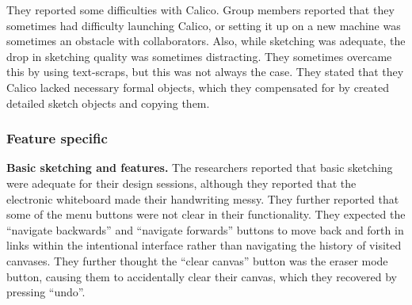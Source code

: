 
They reported some difficulties with Calico. Group members reported that they sometimes had difficulty launching Calico, or setting it up on a new machine was sometimes an obstacle with collaborators. Also, while sketching was adequate, the drop in sketching quality was sometimes distracting. They sometimes overcame this by using text-scraps, but this was not always the case. They stated that they Calico lacked necessary formal objects, which they compensated for by created detailed sketch objects and copying them.










\subsubsection{Feature specific}


\textbf{Basic sketching and features.} The researchers reported that basic sketching were adequate for their design sessions, although they reported that the electronic whiteboard made their handwriting messy. They further reported that some of the menu buttons were not clear in their functionality. They expected the ``navigate backwards'' and ``navigate forwards'' buttons to move back and forth in links within the intentional interface rather than navigating the history of visited canvases. They further thought the ``clear canvas'' button was the eraser mode button, causing them to accidentally clear their canvas, which they recovered by pressing ``undo''.

